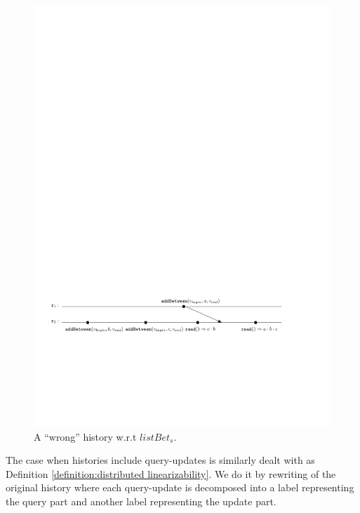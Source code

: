 {\begin{figure}[t]
  \centering
  \includegraphics[width=0.85 \textwidth]{figures/ErrorExecutionofWooki.pdf}
\vspace{-10pt}
  \caption{A ``wrong'' history w.r.t $\mathit{listBet}_s$.}
  \label{fig:a wrong history w.r.t listbets}
\end{figure}



The case when histories include query-updates is similarly dealt with as Definition \ref{definition:distributed linearizability}. We do it by rewriting of the original history where each query-update is decomposed into a label representing the query part and another label representing the update part.

}
